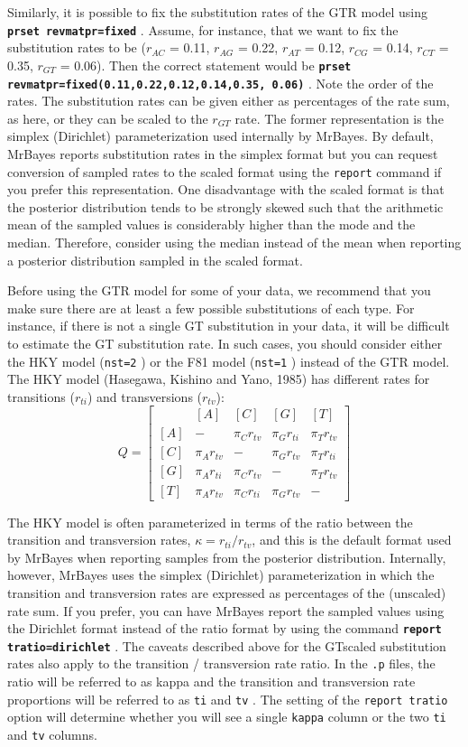 \documentclass[12pt]{book}
\newcommand{\ttt}[1]{\texttt{#1} }
\newcommand{\tb}[1]{\texttt{\textbf{#1}} }
\begin{document}
Similarly, it is possible to fix the substitution rates of the GTR model using \tb{prset
revmatpr=fixed}. Assume, for instance, that we want to fix the substitution rates to
be ($r_{AC}$ = 0.11, $r_{AG}$ = 0.22, $r_{AT}$ = 0.12, $r_{CG}$ = 0.14, $r_{CT}$ = 0.35, $r_{GT}$ = 0.06). 
Then the correct statement would be \tb{prset revmatpr=fixed(0.11,0.22,0.12,0.14,0.35,
0.06)}. Note the order of the rates. The substitution rates can be given either as
percentages of the rate sum, as here, or they can be scaled to the $r_{GT}$ rate. The former
representation is the simplex (Dirichlet) parameterization used internally by MrBayes. By default,
MrBayes reports substitution rates in the simplex format but you can request conversion
of sampled rates to the scaled format using the \ttt{report} command if you prefer this
representation. One disadvantage with the scaled format is that the posterior distribution
tends to be strongly skewed such that the arithmetic mean of the sampled values is
considerably higher than the mode and the median. Therefore, consider using the median
instead of the mean when reporting a posterior distribution sampled in the scaled format.

Before using the GTR model for some of your data, we recommend that you make sure
there are at least a few possible substitutions of each type. For instance, if there is not a
single GT substitution in your data, it will be difficult to estimate the GT substitution
rate. In such cases, you should consider either the HKY model (\ttt{nst=2}) or the F81
model (\ttt{nst=1}) instead of the GTR model. The HKY model (Hasegawa, Kishino and
Yano, 1985) has different rates for transitions ($r_{ti}$) and transversions ($r_{tv}$):
\[
Q=\begin{bmatrix}
    & [A] & [C] & [G] & [T] \\ 
 [A]& - & \pi_C r_{tv} & \pi_G r_{ti} & \pi_T r_{tv}\\ 
 [C]& \pi_A r_{tv} & - & \pi_G r_{tv} &\pi_T r_{ti} \\ 
 [G]& \pi_A r_{ti} & \pi_C r_{tv}& - & \pi_T r_{tv}\\ 
 [T]& \pi_A r_{tv} & \pi_C r_{ti}&\pi_G r_{tv}  & -
\end{bmatrix}
\]

The HKY model is often parameterized in terms of the ratio between the transition and
transversion rates, $\kappa = r_{ti}/r_{tv}$, and this is the default format used by MrBayes when
reporting samples from the posterior distribution. Internally, however, MrBayes uses the
simplex (Dirichlet) parameterization in which the transition and transversion rates are expressed as
percentages of the (unscaled) rate sum. If you prefer, you can have MrBayes report the
sampled values using the Dirichlet format instead of the ratio format by using the
command \tb{report tratio=dirichlet}. The caveats described above for the GTscaled
substitution rates also apply to the transition / transversion rate ratio. In the \ttt{.p}
files, the ratio will be referred to as kappa and the transition and transversion rate
proportions will be referred to as \ttt{ti} and \ttt{tv}. The setting of the \ttt{report tratio}
option will determine whether you will see a single \ttt{kappa} column or the two \ttt{ti} and \ttt{tv}
columns.
\end{document}
